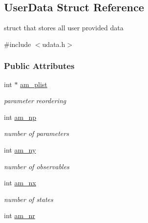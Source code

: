 \hypertarget{struct_user_data}{}\subsection{User\+Data Struct Reference}
\label{struct_user_data}


struct that stores all user provided data  




{\ttfamily \#include $<$udata.\+h$>$}

\subsubsection*{Public Attributes}
\begin{DoxyCompactItemize}
\item 
\hypertarget{struct_user_data_a122fcb4f213656e29d30e1e8713fcf1c}{}int $\ast$ \hyperlink{struct_user_data_a122fcb4f213656e29d30e1e8713fcf1c}{am\+\_\+plist}\label{struct_user_data_a122fcb4f213656e29d30e1e8713fcf1c}

\begin{DoxyCompactList}\small\item\em parameter reordering \end{DoxyCompactList}\item 
\hypertarget{struct_user_data_a1b32993ff88dfae4dd2aab311c24cc26}{}int \hyperlink{struct_user_data_a1b32993ff88dfae4dd2aab311c24cc26}{am\+\_\+np}\label{struct_user_data_a1b32993ff88dfae4dd2aab311c24cc26}

\begin{DoxyCompactList}\small\item\em number of parameters \end{DoxyCompactList}\item 
\hypertarget{struct_user_data_a1c8d4eb301c60c34dc4870faca7ce5a4}{}int \hyperlink{struct_user_data_a1c8d4eb301c60c34dc4870faca7ce5a4}{am\+\_\+ny}\label{struct_user_data_a1c8d4eb301c60c34dc4870faca7ce5a4}

\begin{DoxyCompactList}\small\item\em number of observables \end{DoxyCompactList}\item 
\hypertarget{struct_user_data_a00ba9cf99f8f02b663241bb76b76ce96}{}int \hyperlink{struct_user_data_a00ba9cf99f8f02b663241bb76b76ce96}{am\+\_\+nx}\label{struct_user_data_a00ba9cf99f8f02b663241bb76b76ce96}

\begin{DoxyCompactList}\small\item\em number of states \end{DoxyCompactList}\item 
\hypertarget{struct_user_data_aa56d89d6184e84681395d1b00069f883}{}int \hyperlink{struct_user_data_aa56d89d6184e84681395d1b00069f883}{am\+\_\+nr}\label{struct_user_data_aa56d89d6184e84681395d1b00069f883}


\end{DoxyCompactItemize}
